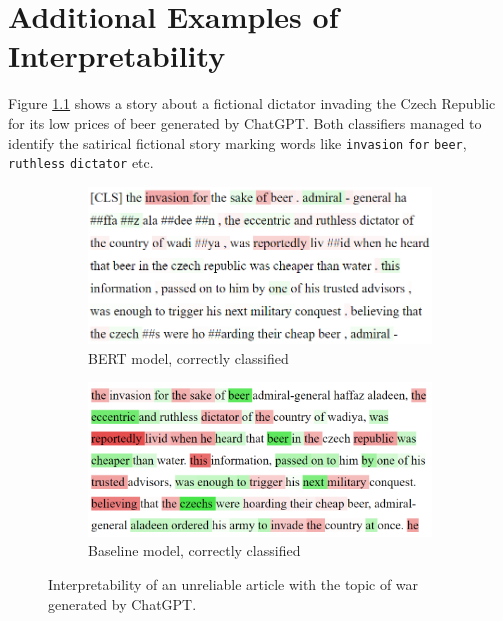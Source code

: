 
\chapter{Additional Examples of Interpretability}
Figure \ref{fig:apend1_a} shows a story about a fictional dictator invading the Czech Republic for its low prices of beer generated by ChatGPT. Both classifiers managed to identify the satirical fictional story marking words like \texttt{invasion} \texttt{for} \texttt{beer}, \texttt{ruthless} \texttt{dictator} etc.

\begin{figure}[H]
    \centering
    \begin{subfigure}{.5\textwidth}
      \centering
      \includegraphics[width=\linewidth]{obrazky-figures/dictator.png}
      \caption{BERT model, correctly classified}
      \label{fig:apend1_a}
    \end{subfigure}%
    \begin{subfigure}{.5\textwidth}
      \centering
      \includegraphics[width=\linewidth]{obrazky-figures/bayes_dictator.png}
      \caption{Baseline model, correctly classified}
      \label{fig:apend1_b}
    \end{subfigure}
    \caption{Interpretability of an unreliable article with the topic of war generated by ChatGPT.}
    \label{fig:apend1}
\end{figure}

